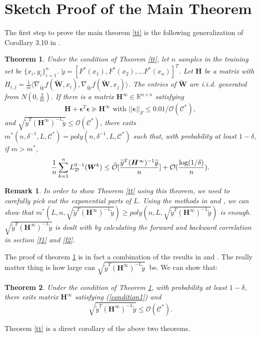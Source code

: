 \documentclass{article}
\newcommand{\cO}{\mathcal{O}}
\newtheorem{theo}{\textbf{Theorem}}
\newtheorem{rem}{\textbf{Remark}}[section]
\newcommand{\dataset}{{\cal D}}
\begin{document}
\section{Sketch Proof of the Main Theorem}
The first step to prove the main theorem \ref{tt} is the following generalization of Corollary 3.10 in \cite{cao}.
\begin{theo}\label{mt}
Under the condition of Theorem \ref{tt}, let $n$ samples in the training set be $\{x_i,y_i\}_{i=1}^n$. $\widetilde{y}=[F^*(x_1),F^*(x_2),...F^*(x_n)]^T$. Let $\bm{H}$ be a matrix with $H_{i,j}= \frac{1}{m}\langle \nabla_{\widetilde{W}} f(\widetilde{\bm{W}},x_i),\nabla_{\widetilde{W}} f(\widetilde{\bm{W}},x_j) \rangle$. The entries of $\widetilde{\bm{W}}$ are i.i.d. generated from $N(0,\frac{2}{m})$.
If there is a matrix $\bm{H}^\infty \in \mathbb{R}^{n\times n}$ satisfying
\begin{equation}\label{condition1}
\bm{H} +\bm{\epsilon}^T\bm{\epsilon} \succeq \bm{H}^\infty \text{ with } ||\bm{\epsilon}||_F\leq 0.01/\cO(\mathscr{C}^*),
\end{equation}
and $\sqrt{\widetilde{y}^T (\bm{H}^\infty)^{-1}\widetilde{y}}\leq \cO(\mathscr{C}^*)$,
there exits $m^*(n,\delta^{-1},L,\mathscr{C}^*)=poly(n,\delta^{-1},L,\mathscr{C}^*)$ such that, with probability at least $1-\delta$, if $m>m^*$,
\begin{equation}
\frac{1}{n} \sum_{k=1}^n L^{0-1}_{\dataset}(\bm{W}^k)\leq \widetilde{\cO}[\frac{\widetilde{y}^T (\bm{H}^\infty)^{-1}\widetilde{y}}{n}]+\cO(\frac{\log(1/\delta)}{n}).
\end{equation}
\end{theo}
\begin{rem}
In order to show Theorem \ref{tt} using this theorem, we need to carefully pick out the exponential parts of $L$. Using the methods in \cite{rate} and \cite{cao}, we can show that $m^*(L,n,\sqrt{\widetilde{y}^T (\bm{H}^\infty)^{-1}\widetilde{y}})\geq poly(n,L,\sqrt{\widetilde{y}^T (\bm{H}^\infty)^{-1}\widetilde{y}})$ is enough.   $\sqrt{\widetilde{y}^T (\bm{H}^\infty)^{-1}\widetilde{y}}$ is dealt with by calculating the forward and backward correlation in section \ref{f1} and \ref{f2}.
\end{rem}
The proof of theorem \ref{mt} is in fact a combination of the results in \cite{cao} and \cite{rate}. The really matter thing is how large can $\sqrt{\widetilde{y}^T (\bm{H}^\infty)^{-1}\widetilde{y}} \ $ be. We can show that:
\begin{theo}\label{mc}
Under the condition of Theorem \ref{mt}, with probability at least $1-\delta$, there exits matrix $\bm{H}^\infty$ satisfying (\ref{condition1}) and
\begin{equation}\label{ec}
\sqrt{\widetilde{y}^T (\bm{H}^\infty)^{-1}\widetilde{y}}\leq \cO(\mathscr{C}^*).
\end{equation}
\end{theo}
Theorem \ref{tt} is a direct corollary of the above two theorems.
\end{document}
